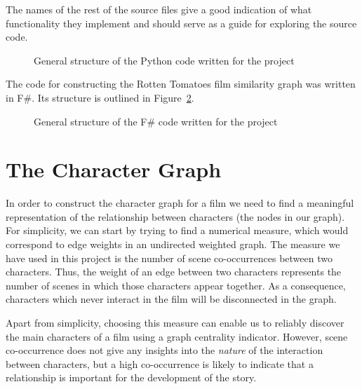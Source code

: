 \documentclass[bsc,frontabs,singlespacing,parskip, twoside]{infthesis}
\begin{document}
The names of the rest of the source files give a good indication of what functionality they implement and should serve as a guide for exploring the source code.

\hspace{.1in}
\begin{figure}[ht!]
\caption{General structure of the Python code written for the project}
\label{fig:dirtree}
\end{figure}

The code for constructing the Rotten Tomatoes film similarity graph was written in F\#. Its structure is outlined in Figure~\ref{fig:fsharpdirtree}.

\begin{figure}[th!]
\caption{General structure of the F\# code written for the project}
\label{fig:fsharpdirtree}
\end{figure}

\section{The Character Graph}
In order to construct the character graph for a film we need to find a meaningful representation of the relationship between characters (the nodes in our graph). For simplicity, we can start by trying to find a numerical measure, which would correspond to edge weights in an undirected weighted graph. The measure we have used in this project is the number of scene co-occurrences between two characters. Thus, the weight of an edge between two characters represents the number of scenes in which those characters appear together. As a consequence, characters which never interact in the film will be disconnected in the graph. 

Apart from simplicity, choosing this measure can enable us to reliably discover the main characters of a film using a graph centrality indicator. However, scene co-occurrence does not give any insights into the \textit{nature} of the interaction between characters, but a high co-occurrence is likely to indicate that a relationship is important for the development of the story.
\end{document}
